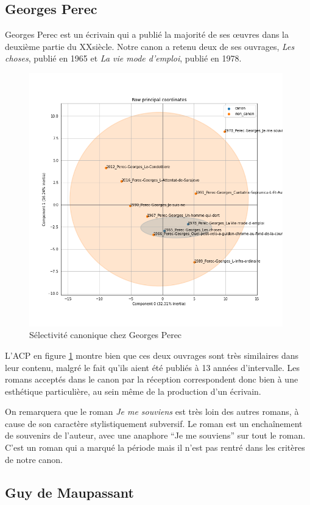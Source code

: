 \subsection{Georges Perec}

Georges Perec est un écrivain qui a publié la majorité de ses œuvres dans la deuxième partie du XX\ieme siècle. Notre canon a retenu deux de ses ouvrages, \textit{Les choses}, publié en 1965 et \textit{La vie mode d'emploi}, publié en 1978.

\bigskip
\begin{figure}[!ht]
    \centering
    \includegraphics[width=11cm]{img/16_pca_Perec.png}
    \caption{Sélectivité canonique chez Georges Perec}
    \label{perec}
\end{figure}

L'ACP en figure \ref{perec} montre bien que ces deux ouvrages sont très similaires dans leur contenu, malgré le fait qu'ils aient été publiés à 13 années d'intervalle. Les romans acceptés dans le canon par la réception correspondent donc bien à une esthétique particulière, au sein même de la production d'un écrivain.

On remarquera que le roman \textit{Je me souviens} est très loin des autres romans, à cause de son caractère stylistiquement subversif. Le roman est un enchaînement de souvenirs de l'auteur, avec une anaphore \enquote{Je me souviens} sur tout le roman. 
C'est un roman qui a marqué la période mais il n'est pas rentré dans les critères de notre canon. 


\subsection{Guy de Maupassant}


